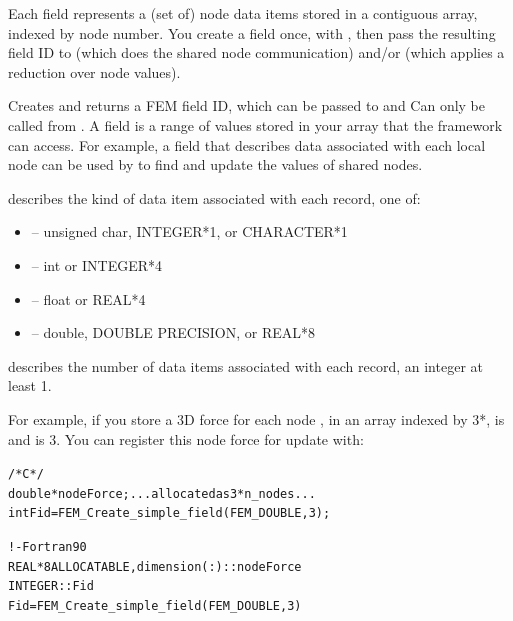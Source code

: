 \documentclass[10pt]{article}
\begin{document}
Each field represents a (set of) node data items stored in a contiguous array,
indexed by node number.  You create a field once, with ,
then pass the resulting field ID to  (which does the
shared node communication) and/or  (which applies a
reduction over node values).

    
    Creates and returns a FEM field ID, which can be passed to
 and   Can only be called from
.  A field is a range of values stored in your array that the framework
can access.  For example, a field that describes data associated with each local 
node can be used by  to find and update the values of 
shared nodes.

     describes the kind of data item associated with each
record, one of:

     \begin{itemize}
        \item {}-- unsigned char, INTEGER*1, or CHARACTER*1
        \item {}-- int or INTEGER*4
        \item {}-- float or REAL*4
        \item {}-- double, DOUBLE PRECISION, or REAL*8
     \end{itemize}

      describes the number of data items associated with each
record, an integer at least 1.

     For example, if you store a 3D force for each node , in an array
indexed by 3*,  is  and  is 3.
You can register this node force for update with:

\begin{alltt}
          /* C */
          double *nodeForce; ... allocated as 3*n_nodes...
          int Fid=FEM_Create_simple_field(FEM_DOUBLE,3);
 
          ! - Fortran90
          REAL*8 ALLOCATABLE, dimension(:) :: nodeForce
          INTEGER :: Fid
          Fid=FEM_Create_simple_field(FEM_DOUBLE,3)
\end{alltt}
\end{document}
